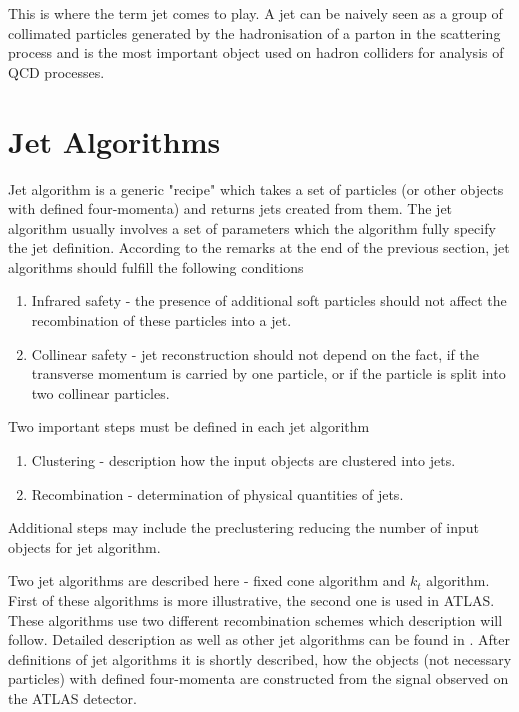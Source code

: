 This is where the term jet comes to play. A jet can be naively seen as a group
of collimated particles generated by the hadronisation of a parton in the
scattering process and is the most important object used on hadron colliders for
analysis of QCD processes.

\section{Jet Algorithms}

Jet algorithm is a generic "recipe" which takes a set of particles (or other
objects with defined four-momenta) and returns jets created from them. The jet
algorithm usually involves a set of parameters which the algorithm fully specify
the jet definition. According to the remarks at the end of the previous section,
jet algorithms should fulfill the following conditions 

\begin{enumerate}
  \item Infrared safety - the presence of additional soft particles should not
    affect the recombination of these particles into a jet.
  \item Collinear safety - jet reconstruction should not depend on the fact, if
    the transverse momentum is carried by one particle, or if the particle is split
    into two collinear particles.
\end{enumerate}
Two important steps must be defined in each jet algorithm

\begin{enumerate}
  \item Clustering - description how the input objects are clustered into jets.
  \item Recombination - determination of physical quantities of jets.
\end{enumerate}
Additional steps may include the preclustering reducing the number of input
objects for jet algorithm.

Two jet algorithms are described here - fixed cone algorithm and $k_t$
algorithm. First of these algorithms is more illustrative, the second one is
used in ATLAS. These algorithms use two different recombination schemes which
description will follow.  Detailed description as well as other jet algorithms
can be found in \cite{ATLASmain,JetDoporuceniZdenek}. After definitions of jet
algorithms it is shortly described, how the objects (not necessary particles)
with defined four-momenta are constructed from the signal observed on the ATLAS
detector.

